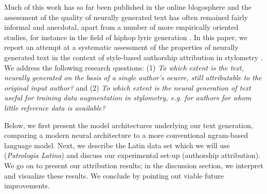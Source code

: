 \documentclass[11pt]{article}
\begin{document}
Much of this work has so far been published in the online blogosphere and the assessment of the quality of neurally generated text has often remained fairly informal and anecdotal, apart from a number of more empirically oriented studies, for instance in the field of hiphop lyric generation \cite{potashEA2015,malmiEA2015}. In this paper, we report an attempt at a systematic assessment of the properties of neurally generated text in the context of style-based authorship attribution in stylometry \cite{stamatatos2009}. We address the following research questions: (1) \emph{To which extent is the text, neurally generated on the basis of a single author's oeuvre, still attributable to the original input author?} and (2) \emph{To which extent is the neural generation of text useful for training data augmentation in stylometry, e.g. for authors for whom little reference data is available?} 

Below, we first present the model architectures underlying our text generation, comparing a modern neural architecture to a more conventional ngram-based language model. Next, we describe the Latin data set which we will use (\emph{Patrologia Latina}) and discuss our experimental set-up (authorship attribution). We go on to present our attribution results; in the discussion section, we interpret and visualize these results. We conclude by pointing out viable future improvements.
\end{document}
